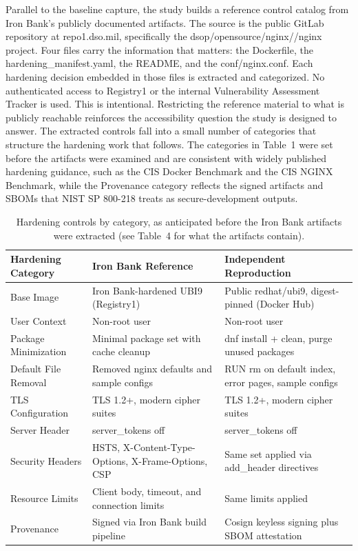 \documentclass[10pt,letterpaper,twocolumn]{article}
\begin{document}
Parallel to the baseline capture, the study builds a reference control catalog from Iron Bank's publicly documented artifacts. The source is the public GitLab repository at repo1.dso.mil, specifically the dsop/\allowbreak opensource/\allowbreak nginx//\allowbreak nginx project. Four files carry the information that matters: the Dockerfile, the hardening\_manifest.yaml, the README, and the conf/nginx.conf. Each hardening decision embedded in those files is extracted and categorized. No authenticated access to Registry1 or the internal Vulnerability Assessment Tracker is used. This is intentional. Restricting the reference material to what is publicly reachable reinforces the accessibility question the study is designed to answer. The extracted controls fall into a small number of categories that structure the hardening work that follows. The categories in Table~1 were set before the artifacts were examined and are consistent with widely published hardening guidance, such as the CIS Docker Benchmark and the CIS NGINX Benchmark, while the Provenance category reflects the signed artifacts and SBOMs that NIST SP 800-218 treats as secure-development outputs.

\begin{table}[tb]
\caption{Hardening controls by category, as anticipated before the Iron Bank artifacts were extracted (see Table~4 for what the artifacts contain).}
\label{tab:catalog}
\small
\begin{tabularx}{\textwidth}{@{}P{0.19\textwidth}LL@{}}
\toprule
\textbf{Hardening Category} & \textbf{Iron Bank Reference} & \textbf{Independent Reproduction} \\
\midrule
Base Image & Iron Bank-hardened UBI9 (Registry1) & Public redhat/ubi9, digest-pinned (Docker Hub) \\
User Context & Non-root user & Non-root user \\
Package Minimization & Minimal package set with cache cleanup & dnf install + clean, purge unused packages \\
Default File Removal & Removed nginx defaults and sample configs & RUN rm on default index, error pages, sample configs \\
TLS Configuration & TLS 1.2+, modern cipher suites & TLS 1.2+, modern cipher suites \\
Server Header & server\_tokens off & server\_tokens off \\
Security Headers & HSTS, X-Content-Type-Options, X-Frame-Options, CSP & Same set applied via add\_header directives \\
Resource Limits & Client body, timeout, and connection limits & Same limits applied \\
Provenance & Signed via Iron Bank build pipeline & Cosign keyless signing plus SBOM attestation \\
\bottomrule
\end{tabularx}
\end{table}
\end{document}
